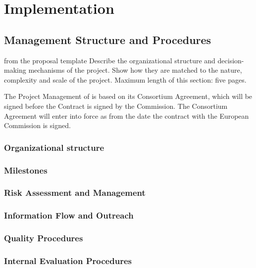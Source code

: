 \chapter{Implementation}\label{chap:implementation}

\section{Management Structure and Procedures}\label{chap:management}
\begin{todo}{from the proposal template}
  Describe the organizational structure and decision-making mechanisms
  of the project. Show how they are matched to the nature, complexity
  and scale of the project.  Maximum length of this section: five pages.
\end{todo}

The Project Management of {\pn} is based on its Consortium Agreement, which will be
signed before the Contract is signed by the Commission. The Consortium Agreement will
enter into force as from the date the contract with the European Commission is signed.
\subsection{Organizational structure}\label{sec:management-structure}
\subsection{Milestones}\label{sec:milestones}
\milestonetable
\subsection{Risk Assessment and Management}
\subsection{Information Flow and Outreach}\label{sec:spread-excellence}
\subsection{Quality Procedures}\label{sec:quality-management}
\subsection{Internal Evaluation Procedures}
\newpage
